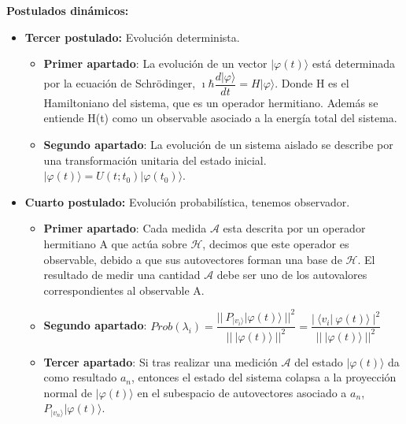 \textbf{Postulados dinámicos:}
\begin{itemize}
    \item \textbf{Tercer postulado:}\label{Postulado3} Evolución determinista.
        \begin{itemize}
            \item \textbf{Primer apartado}:\label{Postulado3.1} La evolución de un vector $| \varphi (t) \rangle$ está determinada por la ecuación de Schrödinger, $\imath \hbar \dfrac{d|\varphi\rangle}{dt}=H |\varphi\rangle$. Donde H es el Hamiltoniano del sistema, que es un operador hermitiano. Además se entiende H(t) como un observable asociado a la energía total del sistema.
            \item \textbf{Segundo apartado}:\label{Postulado3.2} La evolución de un sistema aislado se describe por una transformación unitaria del estado inicial. $| \varphi (t) \rangle = U(t;t_{0})  | \varphi (t_{0}) \rangle$.
        \end{itemize}
    
    \vspace{5pt}
    \newpage
    \item \textbf{Cuarto postulado:}\label{Postulado4} Evolución probabilística, tenemos observador.
    \begin{itemize}
        \item \textbf{Primer apartado}:\label{Postulado4.1} Cada medida $\mathscr{A}$ esta descrita por un operador hermitiano A que actúa sobre $\mathscr{H}$, decimos que este operador es observable, debido a que sus autovectores forman una base de $\mathscr{H}$. El resultado de medir una cantidad $\mathscr{A}$ debe ser uno de los autovalores correspondientes al observable A.
        \vspace{10pt}
        \item \textbf{Segundo apartado}:\label{Postulado4.2} $Prob(\lambda_{i}) =  \dfrac{||\:P_{|v_{i}\rangle} | \varphi (t) \rangle\:||^{2}}{||\:| \varphi (t) \rangle\:||^{2}} = \dfrac{|\: \langle  v_{i}  |\: \varphi (t)  \rangle\:|^{2}}{||\:| \varphi (t) \rangle\:||^{2}}$
        \vspace{10pt}
        \item \textbf{Tercer apartado}:\label{Postulado4.3} Si tras realizar una medición $\mathscr{A}$ del estado $|\varphi(t) \rangle$ da como resultado $a_{n}$, entonces el estado del sistema colapsa a la proyección normal de $|\varphi(t) \rangle$ en el subespacio de autovectores asociado a $a_{n}$,  $P_{|v_{n} \rangle} | \varphi (t) \rangle$.
    \end{itemize}
\end{itemize}

